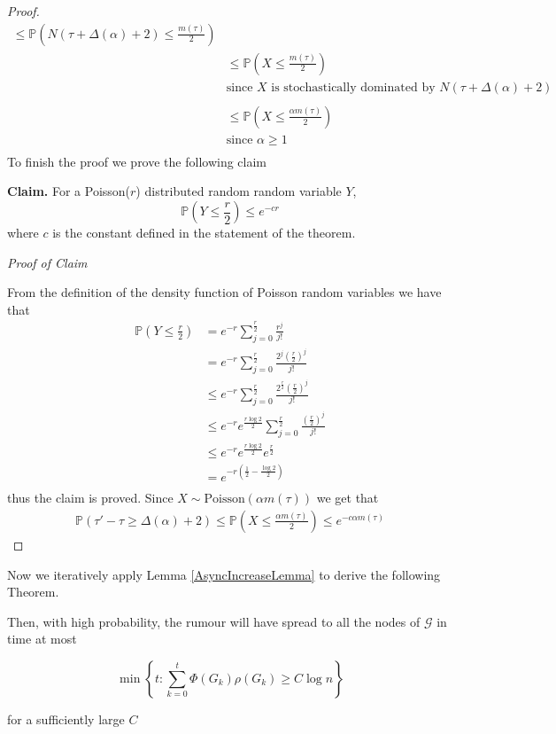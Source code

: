 \begin{proof}
\begin{align*}
		\leq \mathbb{P} (N(\tau + \Delta(\alpha) + 2) \leq \frac{m(\tau)}{2}) \\ %
		& \leq \mathbb{P}(X \leq \frac{m(\tau)}{2}) \\
		& \text{since } X \text{ is stochastically dominated by } N(\tau + \Delta(\alpha) + 2) \\
		& \\
		& \leq \mathbb{P}(X \leq \frac{\alpha m(\tau)}{2}) \\
		& \text{since } \alpha \geq 1 \\ %
	\end{align*}
	To finish the proof we prove the following claim

	\noindent
	\textbf{Claim.} For a Poisson($r$) distributed random random variable $Y$, 
	$$
		\mathbb{P}(Y \leq \frac{r}{2}) \leq e^{-cr}
	$$
	where $c$ is the constant defined in the statement of the theorem.

	\noindent
	\textit{Proof of Claim}

	\noindent
	From the definition of the density function of Poisson random variables we have that 
	\begin{align*}
		\mathbb{P}(Y \leq \frac{r}{2}) & = e^{-r} \sum_{j=0}^\frac{r}{2} \frac{r^j}{j!} \\ %
		& = e^{-r} \sum_{j=0}^\frac{r}{2} \frac{2^j(\frac{r}{2})^j}{j!} \\
		& \leq e^{-r} \sum_{j=0}^\frac{r}{2} \frac{2^\frac{r}{2}(\frac{r}{2})^j}{j!} \\
		& \leq e^{-r} e^\frac{r \log 2}{2} \sum_{j=0}^\frac{r}{2} \frac{(\frac{r}{2})^j}{j!} \\
		& \leq e^{-r} e^\frac{r \log 2}{2} e^\frac{r}{2} \\
		& = e^{-r(\frac{1}{2} - \frac{\log2}{2})} \\ %
	\end{align*}
	thus the claim is proved. Since $X \sim \text{Poisson}(\alpha m(\tau))$ we get that
	\begin{align*}
		\mathbb{P}(\tau' - \tau \geq \Delta(\alpha) + 2) \leq \mathbb{P}(X \leq \frac{\alpha m(\tau)}{2}) \leq e^{-c \alpha m(\tau)}
	\end{align*}	
\end{proof}

Now we iteratively apply Lemma \ref{AsyncIncreaseLemma} to derive the following Theorem.

\begin{theorem}\label{theorem:AsyncUpperBound}
	\ModelIntro Then, with high probability, the rumour will have spread to all the nodes of $\mathcal{G}$ in time at most

	$$
		\min \left\{t : \sum_{k=0}^t \Phi(G_k)\rho(G_k) \geq C \log n \right\} 
	$$

	\noindent
	for a sufficiently large $C$
\end{theorem}

